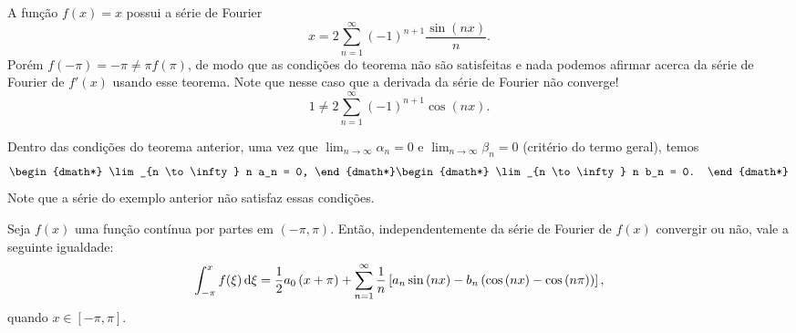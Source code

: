 \begin{exem}
  A função $f(x) = x$ possui a série de Fourier
  \begin{dmath*}
    x = 2 \sum_{n = 1}^\infty (-1)^{n + 1} \frac{\sin\left( n x \right)}{n}.
  \end{dmath*}
  Porém $f(-\pi) = -\pi \neq \pi f(\pi)$, de modo que as condições do teorema
  não são satisfeitas e nada podemos afirmar acerca da série de Fourier de
  $f'(x)$ usando esse teorema. Note que nesse caso que a derivada da série de
  Fourier não converge!
  \begin{dmath*}
    1 \neq 2 \sum_{n = 1}^\infty (-1)^{n + 1} \cos\left( n x \right).
  \end{dmath*}
\end{exem}
\begin{obs}
  Dentro das condições do teorema anterior, uma vez que $\lim_{n \to \infty}
  \alpha_n = 0$ e $\lim_{n \to \infty} \beta_n = 0$ (critério do termo geral),
  temos
  \begin{dgroup*}
    \begin{dmath*}
      \lim_{n \to \infty} n a_n = 0,
    \end{dmath*}
    \begin{dmath*}
      \lim_{n \to \infty} n b_n = 0.
    \end{dmath*}
  \end{dgroup*}
  Note que a série do exemplo anterior não satisfaz essas condições.
\end{obs}
\begin{teo}
  Seja $f(x)$ uma função contínua por partes em $(-\pi,\pi)$. Então,
  independentemente da série de Fourier de $f(x)$ convergir ou não, vale a
  seguinte igualdade:
  \begin{dmath*}
    \int_{-\pi}^x f(\xi) \vi{\xi} = \frac{1}{2} a_0 \left( x + \pi \right) +
    \sum_{n = 1}^\infty \frac{1}{n} \left[ a_n \sin\left( n x \right) - b_n
    \left( \cos\left( n x \right) - \cos\left( n \pi \right) \right) \right],
  \end{dmath*}
  quando $x \in [-\pi,\pi]$.
\end{teo}
